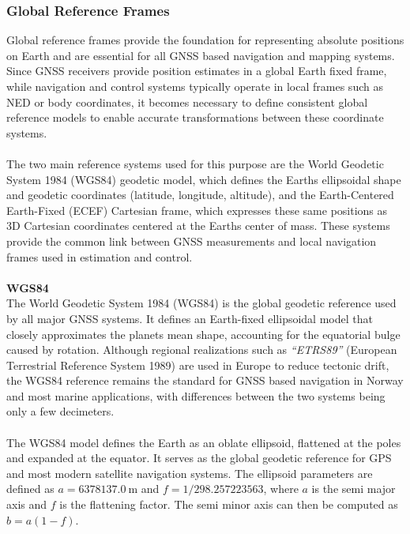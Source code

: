 \subsubsection{Global Reference Frames}
Global reference frames provide the foundation for representing absolute positions on Earth and are essential for all GNSS based navigation and mapping systems. Since GNSS receivers provide position estimates in a global Earth fixed frame, while navigation and control systems typically operate in local frames such as NED or body coordinates, it becomes necessary to define consistent global reference models to enable accurate transformations between these coordinate systems.   
\\ \\
The two main reference systems used for this purpose are the World Geodetic System 1984 (WGS84) geodetic model, which defines the Earths ellipsoidal shape and geodetic coordinates (latitude, longitude, altitude), and the Earth-Centered Earth-Fixed (ECEF) Cartesian frame, which expresses these same positions as 3D Cartesian coordinates centered at the Earths center of mass. These systems provide the common link between GNSS measurements and local navigation frames used in estimation and control.
\\ \\
\textbf{WGS84} 
\\ \noindent
The World Geodetic System 1984 (WGS84) is the global geodetic reference used by all major GNSS systems. It defines an Earth-fixed ellipsoidal model that closely approximates the planets mean shape, accounting for the equatorial bulge caused by rotation. Although regional realizations such as \textit{``ETRS89''} (European Terrestrial Reference System 1989) are used in Europe to reduce tectonic drift, the WGS84 reference remains the standard for GNSS based navigation in Norway and most marine applications, with differences between the two systems being only a few decimeters.
\\ \\
The WGS84 model defines the Earth as an oblate ellipsoid, flattened at the poles and expanded at the equator. It serves as the global geodetic reference for GPS and most modern satellite navigation systems. The ellipsoid parameters are defined as $a = 6378137.0~\text{m}$ and $f = 1/298.257223563$, where $a$ is the semi major axis and $f$ is the flattening factor. The semi minor axis can then be computed as $b = a(1-f)$.  
\\ \\
